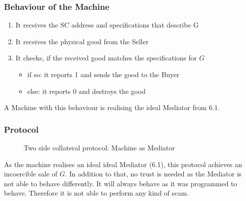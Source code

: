 \documentclass{cacthesis}
\begin{document}
\subsubsection{Behaviour of the Machine}
\begin{enumerate}
    \item It receives the SC address and specifications that describe G
    \item It receives the physical good from the Seller
    \item It checks, if the received good matches the specifications for $G$
        \begin{itemize}
            \item if so: it reports 1 and sends the good to the Buyer
            \item else: it reports 0 and destroys the good
        \end{itemize}
\end{enumerate}
A Machine with this behaviour is realising the ideal Mediator from 6.1. 

\subsubsection{Protocol}
\begin{figure}[htb!]
    \centering
    \caption{Two side collateral protocol: Machine as Mediator}
    \label{pro:two-side-collateral-machine}
\end{figure}

As the machine realises an ideal ideal Mediator (6.1), this protocol achieves an incoercible sale of $G$.\newline
In addition to that, no trust is needed as the Mediator is not able to behave differently. It will always behave as it was programmed to behave. Therefore it is not able to perform any kind of scam.
\end{document}
